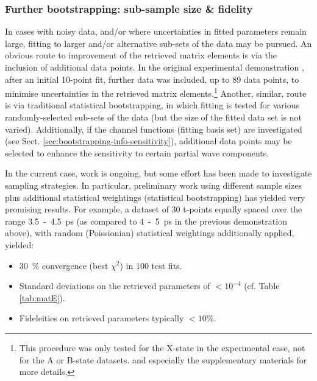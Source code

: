 \documentclass[10pt]{article}
\begin{document}


\subsubsection{Further bootstrapping: sub-sample size \& fidelity}

In cases with noisy data, and/or where uncertainties in fitted parameters remain large, fitting to larger and/or alternative sub-sets of the data may be pursued.
An obvious route to improvement of the retrieved matrix elements is via the inclusion of additional data points. In the original experimental demonstration \cite{marceau2017MolecularFrameReconstruction}, after an initial 10-point fit, further data was included, up to 89 data points, to minimise uncertainties in the retrieved matrix elements.\footnote{This procedure was only tested for the X-state in the experimental case, not for the A or B-state datasets. %
and especially the supplementary materials for more details.} Another, similar, route is via traditional statistical bootstrapping, in which fitting is tested for various randomly-selected sub-sets of the data (but the size of the fitted data set is not varied). Additionally, if the channel functions (fitting basis set) are investigated (see Sect. \ref{sec:bootstrapping-info-sensitivity}), additional data points may be selected to enhance the sensitivity to certain partial wave components.

In the current case, work is ongoing, %
but some effort has been made to investigate sampling strategies. In particular, preliminary work using different sample sizes plus additional statistical weightings (statistical bootstrapping) has yielded very promising results. For example, a dataset of 30 t-points equally spaced over the range 3.5~-~4.5~ps (as compared to 4~-~5~ps in the previous demonstration above), with random (Poissionian) statistical weightings additionally applied, yielded:

\begin{itemize}
\item 30~\% convergence (best $\chi^2$) in 100 test fits.
\item Standard deviations on the retrieved parameters of $<10^{-4}$ (cf. Table \ref{tab:matE}).
\item Fideleities on retrieved parameters typically $<10\%$.
\end{itemize}
\end{document}
